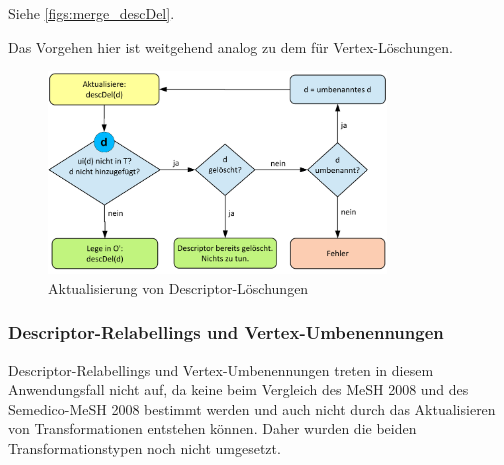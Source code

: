 Siehe \autoref{figs:merge_descDel}. \par 
Das Vorgehen hier ist weitgehend analog zu dem für Vertex-Löschungen.

\begin{figure}
\begin{center}
\includegraphics[width=0.8\textwidth]{figs/merge_descDel.pdf}
\end{center}
\caption{Aktualisierung von Descriptor-Löschungen}
\label{figs:merge_descDel}
\end{figure}

\subsubsection{Descriptor-Relabellings und Vertex-Umbenennungen}
Descriptor-Relabellings und Vertex-Umbenennungen treten in diesem Anwendungsfall nicht auf, da keine beim Vergleich des MeSH 2008 und des Semedico-MeSH 2008 bestimmt werden und auch nicht durch das Aktualisieren von Transformationen entstehen können. Daher wurden die beiden Transformationstypen noch nicht umgesetzt.
